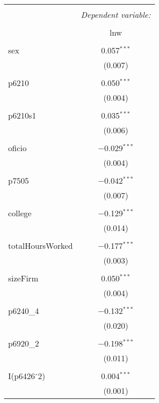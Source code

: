 
\begin{table}[!htbp] \centering 
  \caption{} 
  \label{} 
\begin{tabular}{@{\extracolsep{5pt}}lc} 
\\[-1.8ex]\hline 
\hline \\[-1.8ex] 
 & \multicolumn{1}{c}{\textit{Dependent variable:}} \\ 
\cline{2-2} 
\\[-1.8ex] & lnw \\ 
\hline \\[-1.8ex] 
 sex & 0.057$^{***}$ \\ 
  & (0.007) \\ 
  & \\ 
 p6210 & 0.050$^{***}$ \\ 
  & (0.004) \\ 
  & \\ 
 p6210s1 & 0.035$^{***}$ \\ 
  & (0.006) \\ 
  & \\ 
 oficio & $-$0.029$^{***}$ \\ 
  & (0.004) \\ 
  & \\ 
 p7505 & $-$0.042$^{***}$ \\ 
  & (0.007) \\ 
  & \\ 
 college & $-$0.129$^{***}$ \\ 
  & (0.014) \\ 
  & \\ 
 totalHoursWorked & $-$0.177$^{***}$ \\ 
  & (0.003) \\ 
  & \\ 
 sizeFirm & 0.050$^{***}$ \\ 
  & (0.004) \\ 
  & \\ 
 p6240\_4 & $-$0.132$^{***}$ \\ 
  & (0.020) \\ 
  & \\ 
 p6920\_2 & $-$0.198$^{***}$ \\ 
  & (0.011) \\ 
  & \\ 
 I(p6426$\hat{\mkern6mu}$2) & 0.004$^{***}$ \\ 
  & (0.001) \\ 

\end{tabular}
\end{table}
